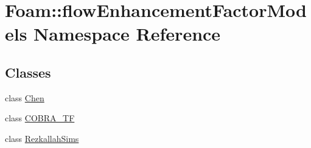 \hypertarget{namespaceFoam_1_1flowEnhancementFactorModels}{}\section{Foam\+:\+:flow\+Enhancement\+Factor\+Models Namespace Reference}
\label{namespaceFoam_1_1flowEnhancementFactorModels}
\subsection*{Classes}
\begin{DoxyCompactItemize}
\item 
class \hyperlink{classFoam_1_1flowEnhancementFactorModels_1_1Chen}{Chen}
\item 
class \hyperlink{classFoam_1_1flowEnhancementFactorModels_1_1COBRA__TF}{C\+O\+B\+R\+A\+\_\+\+TF}
\item 
class \hyperlink{classFoam_1_1flowEnhancementFactorModels_1_1RezkallahSims}{Rezkallah\+Sims}
\end{DoxyCompactItemize}
